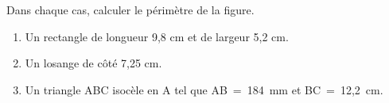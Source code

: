 \documentclass[exercice]{thedocument}%
\begin{document}
%
Dans chaque cas, calculer le périmètre de la figure.
\begin{enumerate}
    \item Un rectangle de longueur 9,8 cm et de largeur 5,2 cm.
    \item Un losange de côté 7,25 cm.
    \item Un triangle ABC isocèle en A tel que AB~=~184~mm et
    BC~=~12,2~cm.
\end{enumerate}
\end{document}
